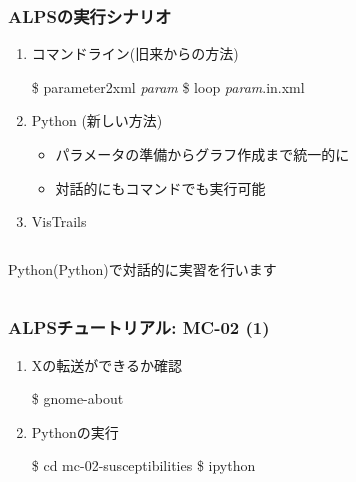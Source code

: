 \begin{frame}[fragile]
  \frametitle{ALPSの実行シナリオ}
  \begin{enumerate}
  \item コマンドライン(旧来からの方法)
\begin{semiverbatim}
\$ parameter2xml \textit{param}
\$ loop \textit{param}.in.xml
\end{semiverbatim}
  \item \alert{Python} (新しい方法)
    \begin{itemize}
    \item パラメータの準備からグラフ作成まで統一的に
    \item 対話的にもコマンドでも実行可能
    \end{itemize}
  \item VisTrails
  \end{enumerate}
  \begin{columns}
    \begin{column}{.7\textwidth}
      \begin{center}
        \begin{alertblock}{}
          Python(Python)で対話的に実習を行います
        \end{alertblock}
      \end{center}
    \end{column}
  \end{columns}
\end{frame}

\begin{frame}[fragile]
  \frametitle{ALPSチュートリアル: MC-02 (1)}
  \begin{enumerate}
  \item<1-> Xの転送ができるか確認
\begin{semiverbatim}
 \$ gnome-about
\end{semiverbatim}
  \item<1-> Pythonの実行
\begin{semiverbatim}
 \$ cd mc-02-susceptibilities
 \$ ipython
\end{semiverbatim}
  \end{enumerate}
\end{frame}

